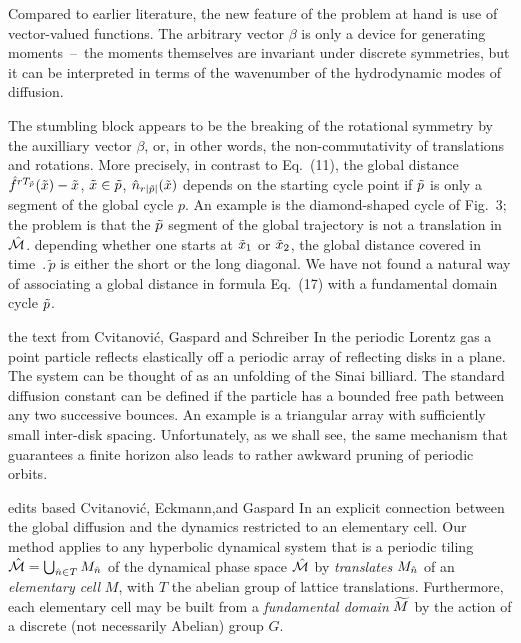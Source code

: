Compared to earlier literature, the new feature of the
problem at hand is use of vector-valued functions. The arbitrary vector
$\beta$ is only a device for generating moments~--~the moments themselves
are invariant under discrete symmetries, but it can be interpreted in
terms of the wavenumber of the hydrodynamic modes of diffusion.

The stumbling block
appears to be
 the breaking of the rotational symmetry by
 the auxilliary vector $\beta$, or, in other words,
the non-commutativity of translations and rotations.
More precisely,
in contrast to Eq.~(11), the global distance
$ \hat f^{r {T_{\tilde{p}}}} (\tilde x{}) - \tilde x{} $, $\tilde x{} \in {\tilde p}$,
 $ \hat{n}_{r |\tilde p|}(\tilde x{}) $
depends on the starting cycle point if
${\tilde p}$ is only a segment of the global cycle $p$. An
example is the diamond-shaped cycle of Fig.~3;
the problem is that the ${\tilde p}$ segment of
the global trajectory is not a translation in $\hat {{\cal M}}$.
depending whether one starts at $\tilde x_1$ or $\tilde x_2$, the global
distance covered in time $\period{\tilde{p}}$ is either the short or the
long diagonal. We have not found a natural way of associating
a global distance in  formula Eq.~(17) with a fundamental domain
cycle ${\tilde p}$.

    {the text from Cvitanovi\'c, Gaspard and Schreiber}
In the periodic Lorentz gas
a point particle reflects elastically off
a periodic array of reflecting disks in a plane.
The system can
be thought of as an unfolding of the Sinai billiard.
The standard diffusion constant can be defined if the particle has a bounded
free path between any two successive bounces.
An example is a triangular array with sufficiently small
inter-disk spacing.
Unfortunately, as we shall see,
the same mechanism that guarantees a finite horizon
also leads to rather awkward pruning of periodic orbits.

    {edits based Cvitanovi\'c,  Eckmann,and Gaspard}
In   an explicit
connection between the global diffusion and the dynamics restricted to
an elementary cell.
Our method applies to any  hyperbolic dynamical system that is
a periodic tiling $\hat {{\cal M}}=\bigcup_{ \hat{n} \in T} M_{
\hat{n}}$
of the dynamical phase space $\hat {{\cal M}}$ by {\sl translates}
$M_{\hat{n}}$
of an {\sl elementary cell} $M$, with $T$ the abelian group of lattice
translations.
Furthermore, each elementary cell may be built from a
{\sl fundamental domain}
${\widetilde M}$
by the action of a discrete (not necessarily Abelian) group $G$.

